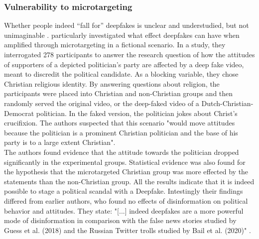 \documentclass[
  a4paper,  %
  twoside,  %
  bibliography=totoc,
  headsepline,
  cleardoublepage=empty,
  parskip=half,
  draft=false
]{scrbook}
\begin{document}
\subsubsection*{Vulnerability to microtargeting}
Whether people indeed “fall for” deepfakes is unclear and understudied, but not unimaginable \cite{dobberMicrotargetedDeepfakesHave2021}. \citet{dobberMicrotargetedDeepfakesHave2021} particularly investigated what effect deepfakes can have when amplified through microtargeting in a fictional scenario. In a study, they interrogated 278 participants to answer the research question of how the attitudes of supporters of a depicted politician's party are affected by a deep fake video, meant to discredit the political candidate. As a blocking variable, they chose Christian religious identity. By answering questions about religion, the participants were placed into Christian and non-Christian groups and then randomly served the original video, or the deep-faked video of a Dutch-Christian-Democrat politician. In the faked version, the politician jokes about Christ's crucifixion. The authors suspected that this scenario "would move attitudes because the politician is a prominent Christian politician and the base of his party is to a large extent Christian". \\
The authors found evidence that the attitude towards the politician dropped significantly in the experimental groups.
Statistical evidence was also found for the hypothesis that the microtargeted Christian group was more effected by the statements than the non-Christian group. All the results indicate that it is indeed possible to stage a political scandal with a Deepfake. Intestingly their findings differed from earlier authors, who found no effects of disinformation on political behavior and attitudes. They state: "[...] indeed deepfakes are a more powerful mode of disinformation in comparison with the false news stories studied by Guess et al. (2018) and the Russian Twitter trolls studied by Bail et al. (2020)" \cite{dobberMicrotargetedDeepfakesHave2021}.
\end{document}

